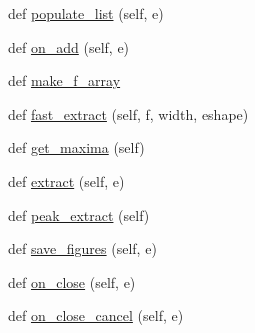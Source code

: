 \begin{DoxyCompactItemize}
\item 
def \hyperlink{class_uni_dec_1_1unidec__modules_1_1nativez_1_1_native_z_ab8332be1c30f5ccebcf2c21060c8dc83}{populate\+\_\+list} (self, e)
\item 
def \hyperlink{class_uni_dec_1_1unidec__modules_1_1nativez_1_1_native_z_a581fc7a8c90fb096431e808d8760ed3e}{on\+\_\+add} (self, e)
\item 
def \hyperlink{class_uni_dec_1_1unidec__modules_1_1nativez_1_1_native_z_abe661285dfa48dc5a306ef6807b94d2d}{make\+\_\+f\+\_\+array}
\item 
def \hyperlink{class_uni_dec_1_1unidec__modules_1_1nativez_1_1_native_z_aacb5a8f8fac6c5c52e1e69836d09c2ac}{fast\+\_\+extract} (self, f, width, eshape)
\item 
def \hyperlink{class_uni_dec_1_1unidec__modules_1_1nativez_1_1_native_z_aba0c11cd856b7330bfc2bb1d4e76ccb0}{get\+\_\+maxima} (self)
\item 
def \hyperlink{class_uni_dec_1_1unidec__modules_1_1nativez_1_1_native_z_a5668226d1851d42fd98892e8456ac6d3}{extract} (self, e)
\item 
def \hyperlink{class_uni_dec_1_1unidec__modules_1_1nativez_1_1_native_z_a5a1e551503a6d1e6630730e1282ee17d}{peak\+\_\+extract} (self)
\item 
def \hyperlink{class_uni_dec_1_1unidec__modules_1_1nativez_1_1_native_z_a88d5f4a6cc16278f1285f7897c68355d}{save\+\_\+figures} (self, e)
\item 
def \hyperlink{class_uni_dec_1_1unidec__modules_1_1nativez_1_1_native_z_aa8f989235d98fa530616a6c796cda666}{on\+\_\+close} (self, e)
\item 
def \hyperlink{class_uni_dec_1_1unidec__modules_1_1nativez_1_1_native_z_a8fadf49e47f1509b7b42bc06d6f44b11}{on\+\_\+close\+\_\+cancel} (self, e)
\end{DoxyCompactItemize}
